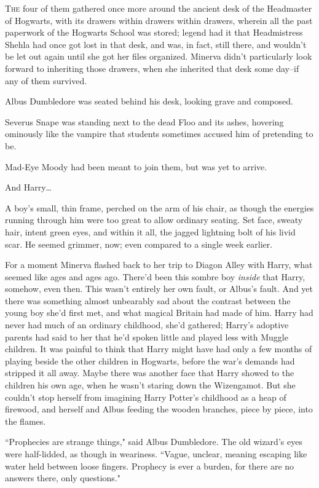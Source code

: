 \lettrine{T}{he} four of them gathered once more around the ancient desk of the Headmaster of Hogwarts, with its drawers within drawers within drawers, wherein all the past paperwork of the Hogwarts School was stored; legend had it that Headmistress Shehla had once got lost in that desk, and was, in fact, still there, and wouldn't be let out again until she got her files organized. Minerva didn't particularly look forward to inheriting those drawers, when she inherited that desk some day\---if any of them survived.

Albus Dumbledore was seated behind his desk, looking grave and composed.

Severus Snape was standing next to the dead Floo and its ashes, hovering ominously like the vampire that students sometimes accused him of pretending to be.

Mad-Eye Moody had been meant to join them, but was yet to arrive.

And Harry{\ldots}

A boy's small, thin frame, perched on the arm of his chair, as though the energies running through him were too great to allow ordinary seating. Set face, sweaty hair, intent green eyes, and within it all, the jagged lightning bolt of his livid scar. He seemed grimmer, now; even compared to a single week earlier.

For a moment Minerva flashed back to her trip to Diagon Alley with Harry, what seemed like ages and ages ago. There'd been this sombre boy \emph{inside} that Harry, somehow, even then. This wasn't entirely her own fault, or Albus's fault. And yet there was something almost unbearably sad about the contrast between the young boy she'd first met, and what magical Britain had made of him. Harry had never had much of an ordinary childhood, she'd gathered; Harry's adoptive parents had said to her that he'd spoken little and played less with Muggle children. It was painful to think that Harry might have had only a few months of playing beside the other children in Hogwarts, before the war's demands had stripped it all away. Maybe there was another face that Harry showed to the children his own age, when he wasn't staring down the Wizengamot. But she couldn't stop herself from imagining Harry Potter's childhood as a heap of firewood, and herself and Albus feeding the wooden branches, piece by piece, into the flames.

``Prophecies are strange things," said Albus Dumbledore. The old wizard's eyes were half-lidded, as though in weariness. ``Vague, unclear, meaning escaping like water held between loose fingers. Prophecy is ever a burden, for there are no answers there, only questions."

